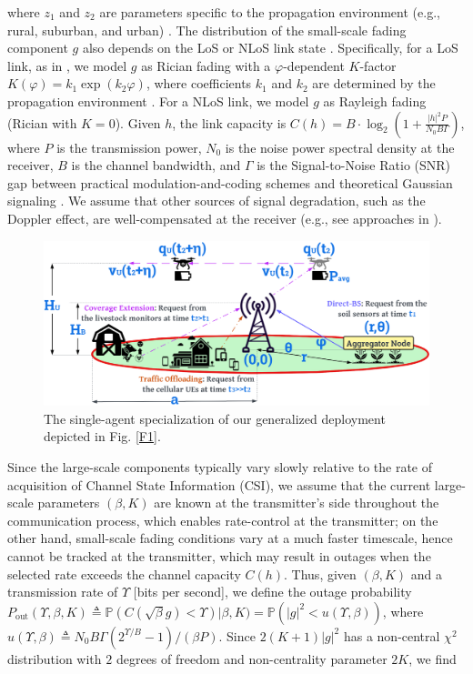 \documentclass[10pt, twocolumn]{IEEEtran}
\theoremstyle{plain}
\theoremstyle{definition}
\theoremstyle{remark}
\begin{document}
where $z_{1}$ and $z_{2}$ are parameters specific to the propagation environment (e.g., rural, suburban, and urban) \cite{LAP}. The distribution of the small-scale fading component $g$ also depends on the LoS or NLoS link state \cite{WCBook}. Specifically, for a LoS link, as in \cite{Rician}, we model $g$ as Rician fading with a $\varphi$-dependent $K$-factor $K(\varphi){=}k_{1}\exp\left(k_{2}\varphi\right)$, where coefficients $k_{1}$ and $k_{2}$ are determined by the propagation environment \cite{Rician}. For a NLoS link, we model $g$ as Rayleigh fading \cite{WCBook} (Rician with $K{=}0$). Given $h$, the link capacity is $C(h){=}B{\cdot}\log_{2}\left(1{+}\frac{|h|^{2}P}{N_{0}B\Gamma} \right)$, where $P$ is the transmission power, $N_{0}$ is the noise power spectral density at the receiver, $B$ is the channel bandwidth, and $\Gamma$ is the Signal-to-Noise Ratio (SNR) gap between practical modulation-and-coding schemes and theoretical Gaussian signaling \cite{Rician}. We assume that other sources of signal degradation, such as the Doppler effect, are well-compensated at the receiver (e.g., see approaches in \cite{Doppler}).
\begin{figure} [t]
    \centering
    \includegraphics[width=0.7\linewidth]{figs/Single_Agent_Specialization.png}
    \caption{The single-agent specialization of our generalized deployment depicted in Fig. \ref{F1}.}
    \label{F4}
    \vspace{-6mm}
\end{figure}
Since the large-scale components typically vary slowly relative to the rate of acquisition of Channel State Information (CSI), we assume that the current large-scale parameters $(\beta,K)$ are known at the transmitter's side throughout the communication process, which enables rate-control at the transmitter; on the other hand, small-scale fading conditions vary at a much faster timescale, hence cannot be tracked at the transmitter, which may result in outages when the selected rate exceeds the channel capacity $C(h)$. Thus, given $(\beta,K)$ and a transmission rate of $\Upsilon$ [bits per second], we define the outage probability $P_{\mathrm{out}}(\Upsilon,\beta,K) \triangleq \mathbb{P}(C(\sqrt{\beta}g){<}\Upsilon)|\beta,K) = \mathbb{P}\left(|g|^{2}{<}u(\Upsilon,\beta)\right)$, where $u(\Upsilon,\beta){\triangleq}N_{0}B\Gamma(2^{\Upsilon/B}{-}1)/(\beta P)$. Since $2(K{+}1)|g|^{2}$ has a non-central $\chi^2$ distribution with $2$ degrees of freedom and non-centrality parameter $2K$, we find
\end{document}
